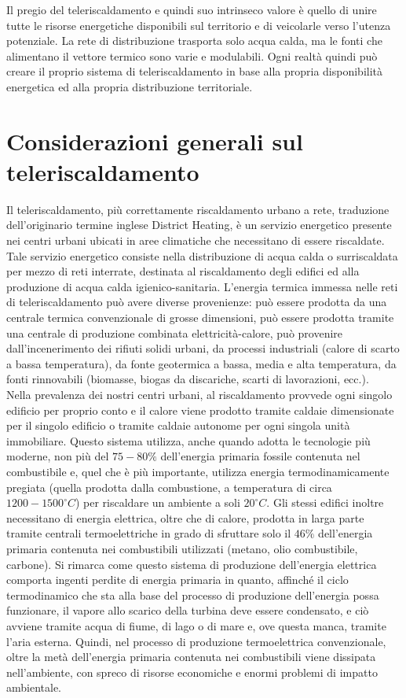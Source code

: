 \documentclass[laurea,oneside,11pt]{USiena_tesiLM}
\begin{document}
 Il pregio del teleriscaldamento e quindi suo intrinseco valore è quello di unire tutte le risorse energetiche disponibili sul territorio e di veicolarle verso l'utenza potenziale. La rete di distribuzione trasporta solo acqua calda, ma le fonti che alimentano il vettore termico sono varie e modulabili. Ogni realtà quindi può creare il proprio sistema di teleriscaldamento in base alla propria disponibilità energetica ed alla propria distribuzione territoriale.


\section{Considerazioni generali sul teleriscaldamento}
Il teleriscaldamento, più correttamente riscaldamento urbano a rete, traduzione dell'originario termine inglese District Heating, è un servizio energetico presente nei centri urbani ubicati in aree climatiche che necessitano di essere riscaldate.
Tale servizio energetico consiste nella distribuzione di acqua calda o surriscaldata per mezzo di reti interrate, destinata al riscaldamento degli edifici ed alla produzione di acqua calda igienico-sanitaria.
L'energia termica immessa nelle reti di teleriscaldamento può avere diverse provenienze: può essere prodotta da una centrale termica convenzionale di grosse dimensioni, può essere prodotta tramite una centrale di produzione combinata elettricità-calore, può provenire dall'incenerimento dei rifiuti solidi urbani, da processi industriali (calore di scarto a bassa temperatura), da fonte geotermica a bassa, media e alta temperatura, da fonti rinnovabili (biomasse, biogas da discariche, scarti di lavorazioni, ecc.).\\

Nella prevalenza dei nostri centri urbani, al riscaldamento provvede ogni singolo edificio per proprio conto e il calore viene prodotto tramite caldaie dimensionate per il singolo edificio o tramite caldaie autonome per ogni singola unità immobiliare.
Questo sistema utilizza, anche quando adotta le tecnologie più moderne, non più del $75-80\%$ dell'energia primaria fossile contenuta nel combustibile e, quel che è più importante, utilizza energia termodinamicamente pregiata (quella prodotta dalla combustione, a temperatura di circa $1200-1500 ^{\circ}C$) per riscaldare un ambiente a soli $20 ^{\circ}C$.
Gli stessi edifici inoltre necessitano di energia elettrica, oltre che di calore, prodotta in larga parte tramite centrali termoelettriche in grado di sfruttare solo il $46\%$ dell'energia primaria contenuta nei combustibili utilizzati (metano, olio combustibile, carbone).
Si rimarca come questo sistema di produzione dell'energia elettrica comporta ingenti perdite di energia primaria in quanto, affinché il ciclo termodinamico che sta alla base del processo di produzione dell'energia possa funzionare, il vapore allo scarico della turbina deve essere condensato, e ciò avviene tramite acqua di fiume, di lago o di mare e, ove questa manca, tramite l'aria esterna. Quindi, nel processo di produzione termoelettrica convenzionale, oltre la metà dell'energia primaria contenuta nei combustibili viene dissipata nell'ambiente, con spreco di risorse economiche e enormi problemi di impatto ambientale.\\
\end{document}
